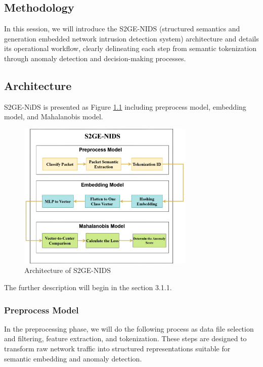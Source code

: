 \begin{ZhChapter}

\chapter{Methodology}
In this session, we will introduce the S2GE-NIDS (structured semantics and generation embedded network intrusion detection system) architecture and details its operational workflow, clearly delineating each step from semantic tokenization through anomaly detection and decision-making processes.
\section{Architecture} %
S2GE-NiDS is presented as Figure \ref{fig: Architecture} including preprocess model, embedding model, and Mahalanobis model.

\begin{figure}[htbp]
    \centering
    \includegraphics[width = 0.75\textwidth]{image/Flow.jpg}
    \caption{Architecture of S2GE-NIDS}
    \label{fig: Architecture}
\end{figure}

The further description will begin in the section 3.1.1.

\subsection{Preprocess Model}
In the preprocessing phase, we will do the following process as data file selection and filtering, feature extraction, and tokenization. These steps are designed to transform raw network traffic into structured representations suitable for semantic embedding and anomaly detection.


\end{ZhChapter}
